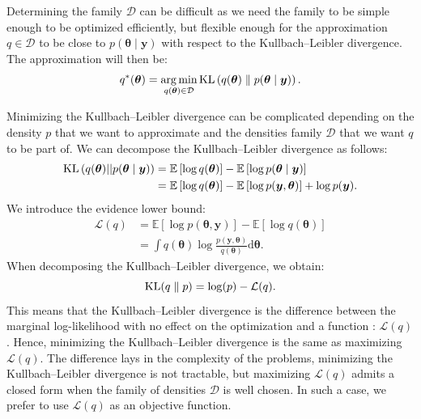 \documentclass{article}
\numberwithin{equation}{section}
\DeclareMathOperator*{\argmin}{arg\,min}
\DeclareMathOperator*{\KL}{{\rm KL}}
\begin{document}
Determining the family $\mathcal{D}$ can be difficult as we need the family to be simple enough to be optimized efficiently, but flexible enough for the approximation $q \in \mathcal{D}$ to be close to $p(\boldsymbol{\theta} \mid \boldsymbol{y})$ with respect to the Kullbach--Leibler divergence. The approximation will then be:
\begin{equation*}
q^*(\boldsymbol{\theta} ) = \argmin_{q(\boldsymbol{\theta}) \in \mathcal{D}} \KL\left( q(\boldsymbol{\theta}) \parallel p(\boldsymbol{\theta} \mid \boldsymbol{y})\right).
\end{equation*}

Minimizing the Kullbach--Leibler divergence can be complicated depending on the density $p$ that we want to approximate and the densities family $\mathcal{D}$ that we want $q$ to be part of. We can decompose the Kullbach--Leibler divergence as follows:
\begin{align*}
\KL\left(q(\boldsymbol{\theta})||p(\boldsymbol{\theta}\mid \boldsymbol{y})\right) &= \mathbb{E}\left[\log q(\boldsymbol{\theta})\right] - \mathbb{E}\left[\log p(\boldsymbol{\theta}\mid \boldsymbol{y})\right]\\
&= \mathbb{E}\left[\log q(\boldsymbol{\theta})\right] - \mathbb{E}\left[\log p(\boldsymbol{y},\boldsymbol{\theta})\right] + \log p(\boldsymbol{y}).
\end{align*}
We introduce the evidence lower bound:
\begin{align*}
\mathcal{L}(q) &= \mathbb{E}\left[\log p(\boldsymbol{\theta},\boldsymbol{y})\right] - \mathbb{E}\left[\log q(\boldsymbol{\theta})\right]\\
&=\int q(\boldsymbol{\theta})\log\frac{p(\boldsymbol{y},\boldsymbol{\theta})}{q(\boldsymbol{\theta})}\mathrm{d}\boldsymbol{\theta}.
\end{align*}
When decomposing the Kullbach--Leibler divergence, we obtain:
\begin{equation*}
\KL(q\parallel p) = \log(p) - \mathcal{L}(q).
\end{equation*}
This means that the Kullbach--Leibler divergence is the difference between the marginal log-likelihood with no effect on the optimization and a function : $\mathcal{L}(q)$. Hence, minimizing the Kullbach--Leibler divergence is the same as maximizing $\mathcal{L}(q)$. The difference lays in the complexity of the problems, minimizing the Kullbach--Leibler divergence is not tractable, but maximizing $\mathcal{L}(q)$ admits a closed form when the family of densities $\mathcal{D}$ is well chosen. In such a case, we prefer to use $\mathcal{L}(q)$ as an objective function.
\end{document}
